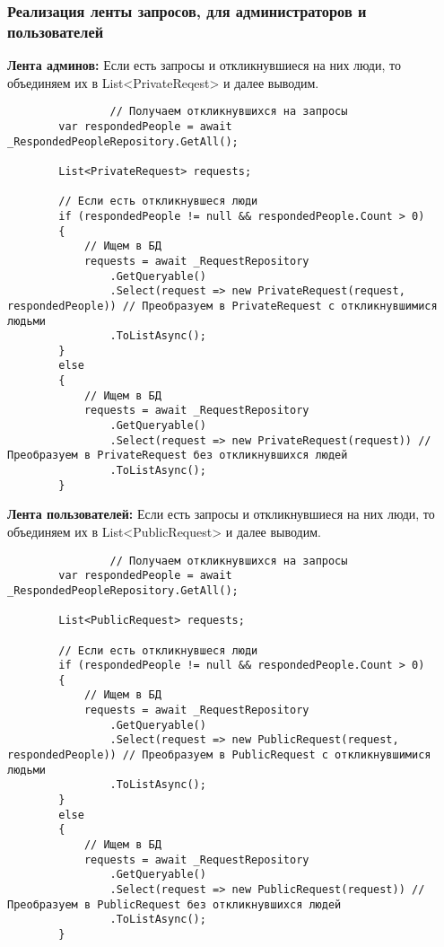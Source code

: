 \subsubsection{Реализация ленты запросов, для администраторов и пользователей}

\textbf{Лента админов:} Если есть запросы и откликнувшиеся на них люди, то объединяем их в List<PrivateReqest> и далее выводим.
\begin{verbatim}
				// Получаем откликнувшихся на запросы
        var respondedPeople = await _RespondedPeopleRepository.GetAll();

        List<PrivateRequest> requests;

        // Если есть откликнувшеся люди
        if (respondedPeople != null && respondedPeople.Count > 0)
        {
            // Ищем в БД
            requests = await _RequestRepository
                .GetQueryable()
                .Select(request => new PrivateRequest(request, respondedPeople)) // Преобразуем в PrivateRequest с откликнувшимися людьми
                .ToListAsync();
        }
        else
        {
            // Ищем в БД
            requests = await _RequestRepository
                .GetQueryable()
                .Select(request => new PrivateRequest(request)) // Преобразуем в PrivateRequest без откликнувшихся людей
                .ToListAsync();
        }
\end{verbatim}

\textbf{Лента пользователей:}  Если есть запросы и откликнувшиеся на них люди, то объединяем их в List<PublicRequest> и далее выводим.
\begin{verbatim}
				// Получаем откликнувшихся на запросы
        var respondedPeople = await _RespondedPeopleRepository.GetAll();

        List<PublicRequest> requests;

        // Если есть откликнувшеся люди
        if (respondedPeople != null && respondedPeople.Count > 0)
        {
            // Ищем в БД
            requests = await _RequestRepository
                .GetQueryable()
                .Select(request => new PublicRequest(request, respondedPeople)) // Преобразуем в PublicRequest с откликнувшимися людьми
                .ToListAsync();
        }
        else
        {
            // Ищем в БД
            requests = await _RequestRepository
                .GetQueryable()
                .Select(request => new PublicRequest(request)) // Преобразуем в PublicRequest без откликнувшихся людей
                .ToListAsync();
        }
\end{verbatim}

